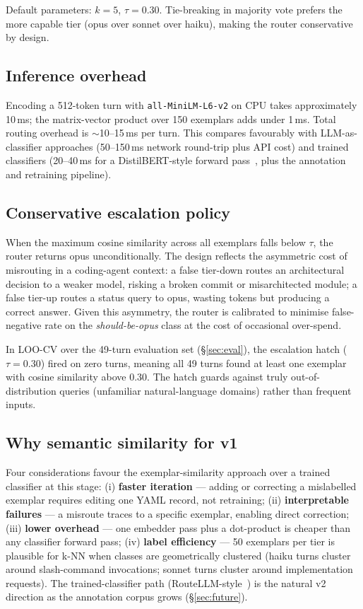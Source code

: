 Default parameters: \(k = 5\), \(\tau = 0.30\).  Tie-breaking in
majority vote prefers the more capable tier (opus over sonnet over
haiku), making the router conservative by design.

\subsection{Inference overhead}

Encoding a 512-token turn with \texttt{all-MiniLM-L6-v2} on CPU takes
approximately 10\,ms; the matrix-vector product over 150 exemplars
adds under 1\,ms.  Total routing overhead is $\sim$10--15\,ms per turn.
This compares favourably with LLM-as-classifier approaches (50--150\,ms
network round-trip plus API cost) and trained classifiers
(20--40\,ms for a DistilBERT-style forward pass~\cite{routellm},
plus the annotation and retraining pipeline).

\subsection{Conservative escalation policy}

When the maximum cosine similarity across all exemplars falls below
\(\tau\), the router returns opus unconditionally.  The design reflects
the asymmetric cost of misrouting in a coding-agent context: a false
tier-down routes an architectural decision to a weaker model, risking
a broken commit or misarchitected module; a false tier-up routes a
status query to opus, wasting tokens but producing a correct answer.
Given this asymmetry, the router is calibrated to minimise
false-negative rate on the \emph{should-be-opus} class at the cost of
occasional over-spend.

In LOO-CV over the 49-turn evaluation set (§\ref{sec:eval}),
the escalation hatch (\(\tau = 0.30\)) fired on zero turns, meaning
all 49 turns found at least one exemplar with cosine similarity above
0.30.  The hatch guards against truly out-of-distribution queries
(unfamiliar natural-language domains) rather than frequent inputs.

\subsection{Why semantic similarity for v1}

Four considerations favour the exemplar-similarity approach over a
trained classifier at this stage:
(i) \textbf{faster iteration} — adding or correcting a mislabelled
    exemplar requires editing one YAML record, not retraining;
(ii) \textbf{interpretable failures} — a misroute traces to a specific
    exemplar, enabling direct correction;
(iii) \textbf{lower overhead} — one embedder pass plus a dot-product
    is cheaper than any classifier forward pass;
(iv) \textbf{label efficiency} — 50 exemplars per tier is plausible
    for k-NN when classes are geometrically clustered (haiku turns
    cluster around slash-command invocations; sonnet turns cluster
    around implementation requests).
The trained-classifier path (RouteLLM-style~\cite{routellm}) is the
natural v2 direction as the annotation corpus grows (§\ref{sec:future}).

